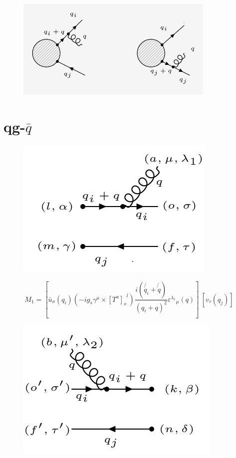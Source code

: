 \begin{figure}[ht!]
\centering
\includegraphics[width=0.85\textwidth]{images/qqg-diagrams.png}
\end{figure}
\pagebreak
\section{qg-$\bar{q}$}

\begin{figure}[h!]
\centering
\includegraphics[scale=0.7]{images/qgqbarM.png}
\end{figure}

\begin{equation}
M_1 = [{\bar{u}}_{\sigma}(q_i) (-ig_s \gamma^{\mu}\times {[T^a]_o}^l)  \frac{i(\not{q_i} + \not{q})}{(q_i + q)^2} {\varepsilon^{\lambda_1}}_{\mu} (q)]\: [{v}_{\tau}(q_j)]
\end{equation}

\begin{figure}[h!]
\centering
\includegraphics[scale=0.7]{images/qgqbarMDega.png}
\end{figure}

